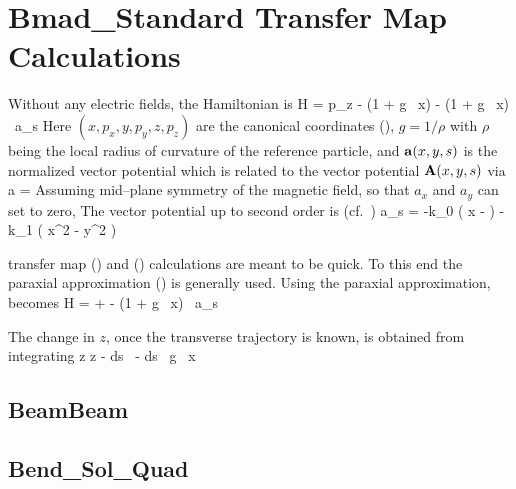 \documentclass{book}
\begin{document}
\setlength{\parskip}{\dPar}
\setlength{\parindent}{0ex}

\section{Bmad\_Standard Transfer Map Calculations}
\label{s:bmad_standard}

Without any electric fields, the Hamiltonian is
\Begineq
  H = p_z - (1 + g \, x)  - 
  (1 + g \, x) \, a_s
  \label{h1gx1}
\Endeq
Here $(x, p_x, y, p_y, z, p_z)$ are the canonical coordinates
(), $g = 1/\rho$ with $\rho$ being the
local radius of curvature of the reference particle, and
${\bf a}(x,y,s)$ is the normalized vector potential which is related to
the vector potential ${\bf A}(x,y,s)$ via
\Begineq
  \Bf a = 
\Endeq
Assuming mid--plane symmetry of the magnetic field, so
that $a_x$ and $a_y$ can set to zero\cite{b:madphysics}, The vector
potential up to second order is (cf.~)
\Begineq
  a_s = -k_0 \left( x -  \right) -
   k_1 \left( x^2 - y^2 \right)
\Endeq

 transfer map () and ()
calculations are meant to be quick. To this end the paraxial
approximation () is generally used.  Using the paraxial
approximation,  becomes
\Begineq
  H =  +  - 
  (1 + g \, x) \, a_s 
  \label{hpapa}
\Endeq

The change in $z$, once the transverse trajectory is
known, is obtained from integrating  
\Begineq
  z \rightarrow z -  \int \! ds \, 
  \left[ (p_x - a_x)^2 + (p_y - a_y)^2 \right] - \int \! ds \, g \, x
  \label{zz121p}
\Endeq



\subsection{BeamBeam}


\subsection{Bend\_Sol\_Quad}
\end{document}
